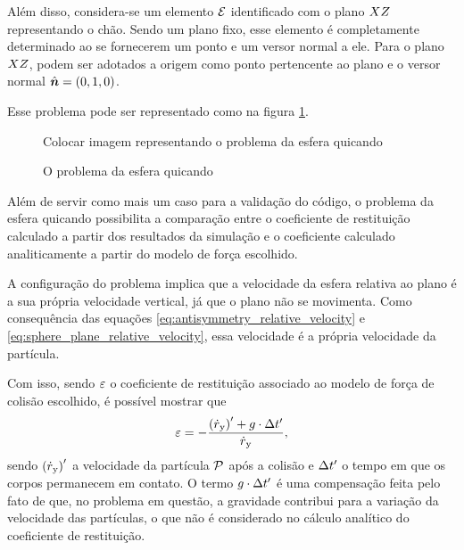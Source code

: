 Além disso, considera-se um elemento \(\mathcal{E}\) identificado com o plano \(XZ\) representando o chão. Sendo um plano fixo, esse elemento é completamente determinado ao se fornecerem um ponto e um versor normal a ele. Para o plano \(XZ\), podem ser adotados a origem como ponto pertencente ao plano e o versor normal \(\planeNormalVersor = \explicitVector{0}{1}{0}\).

Esse problema pode ser representado como na figura \ref{fig:bouncing_sphere}.

\begin{figure}[h]
	\caption{O problema da esfera quicando}
	\begin{center}
		\alert{Colocar imagem representando o problema da esfera quicando}
	\end{center}
	\label{fig:bouncing_sphere}
\end{figure}

Além de servir como mais um caso para a validação do código, o problema da esfera quicando possibilita a comparação entre o coeficiente de restituição calculado a partir dos resultados da simulação e o coeficiente calculado analiticamente a partir do modelo de força escolhido.

A configuração do problema implica que a velocidade da esfera relativa ao plano é a sua própria velocidade vertical, já que o plano não se movimenta. Como consequência das equações \eqref{eq:antisymmetry_relative_velocity} e \eqref{eq:sphere_plane_relative_velocity}, essa velocidade é a própria velocidade da partícula.

Com isso, sendo \(\varepsilon\) o coeficiente de restituição associado ao modelo de força de colisão escolhido, é possível mostrar que
\begin{equation*}
	\coefficientOfRestitution = - \dfrac{\afterCollision{\yComponent{\velocityScalar}} + \gravityScalar\cdot\collisionDuration}{\beforeCollision{\yComponent{\velocityScalar}}},
\end{equation*}
sendo \(\afterCollision{\yComponent{\velocityScalar}}\) a velocidade da partícula \(\particle\) após a colisão e \(\Delta t_{}^{\prime}\) o tempo em que os corpos permanecem em contato. O termo \(g\cdot\Delta t_{}^{\prime}\) é uma compensação feita pelo fato de que, no problema em questão, a gravidade contribui para a variação da velocidade das partículas, o que não é considerado no cálculo analítico do coeficiente de restituição.

